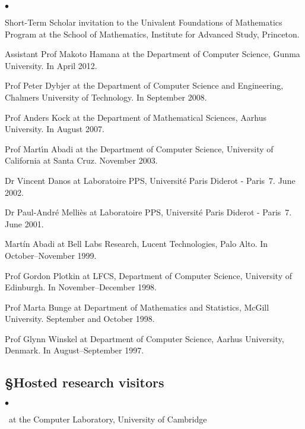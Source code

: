 \documentclass[11pt,twocolumn]{article}
\newenvironment{myitemize}
  {\begin{list}{$\bullet$}
  {\setlength{\topsep}{1pt}
   \setlength{\partopsep}{1pt}
   \setlength{\itemsep}{0pt}
   \setlength{\parsep}{0pt}
   \setlength{\leftmargin}{1em}
   \setlength{\labelwidth}{.5em}}}
  {\end{list}}
\begin{document}
\begin{myitemize}
\item
  Short-Term Scholar invitation to the Univalent Foundations of Mathematics
  Program at the School of Mathematics, Institute for Advanced Study,
  Princeton. 

\item
  Assistant Prof Makoto Hamana at the Department of Computer Science,
  Gunma University.  In April 2012.

\item
  Prof Peter Dybjer at the Department of Computer Science and Engineering,
  Chalmers University of Technology.  In September 2008. 

\item
  Prof Anders Kock at the Department of Mathematical Sciences, Aarhus
  University.  In August 2007. 

\item
  Prof Mart\'{\i}n Abadi at the Department of Computer Science, University
  of California at Santa Cruz.  November 2003. 

\item
  Dr Vincent Danos at Laboratoire PPS, Universit\'e Paris Diderot -
  Paris~7.  June 2002.

\item
  Dr Paul-Andr\'e Melli\`es at Laboratoire PPS, Universit\'e Paris Diderot
  - Paris~7.  June 2001.

\item
  Mart\'{i}n Abadi at Bell Labs Research, Lucent Technologies, Palo Alto.
  In October--November 1999. 

\item
  Prof Gordon Plotkin at LFCS, Department of Computer Science, University
  of Edinburgh.  In November--December 1998.

\item
  Prof Marta Bunge at Department of Mathematics and Statistics, McGill
  University.  September and October 1998.

\item
  Prof Glynn Winskel at Department of Computer Science, Aarhus University,
  Denmark.  In August--September 1997.
\end{myitemize}

\vspace*{-1mm}
\subsection*{\S\enspace\thinspace Hosted research visitors}
\vspace*{-2mm}
\begin{myitemize}
\item[]\small\ at the Computer Laboratory, University of Cambridge
\end{myitemize}
\end{document}
